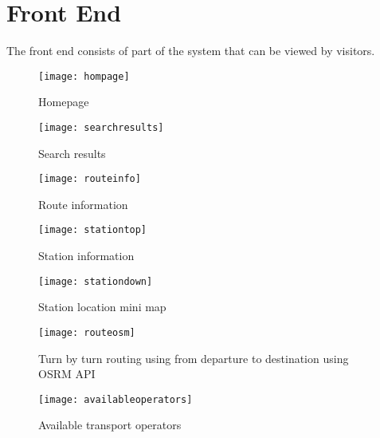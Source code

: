 \section{Front End}
The front end consists of part of the system that can be viewed by visitors.
\begin{figure}[H]
	\centering
	\texttt{[image: hompage]}
	\caption[Homepage]{Homepage}
	\label{fig:hompage}
\end{figure}
\begin{figure}[H]
	\centering
	\texttt{[image: searchresults]}
	\caption[Search Results]{Search results}
	\label{fig:searchresults}
\end{figure}
\begin{figure}[H]
	\centering
	\texttt{[image: routeinfo]}
	\caption[Route Information]{Route information}
	\label{fig:routeinfo}
\end{figure}
\begin{figure}[H]
	\centering
	\texttt{[image: stationtop]}
	\caption[Station information]{Station information}
	\label{fig:stationtop}
\end{figure}
\begin{figure}[H]
	\centering
	\texttt{[image: stationdown]}
	\caption[Station mini map]{Station location mini map}
	\label{fig:stationdown}
\end{figure}
\begin{figure}[H]
	\centering
	\texttt{[image: routeosm]}
	\caption[Turn by turn routing]{Turn by turn routing using from departure to destination using OSRM API}
	\label{fig:routeosm}
\end{figure}
\begin{figure}[H]
	\centering
	\texttt{[image: availableoperators]}
	\caption[Avalable operators]{Available transport operators}
	\label{fig:availableoperators}
\end{figure}

